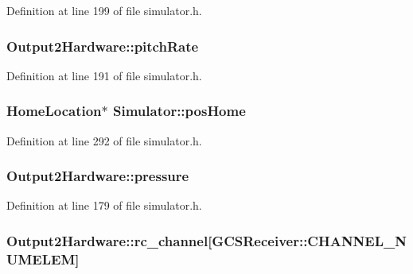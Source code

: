 Definition at line 199 of file simulator.\-h.

\hypertarget{group___h_i_t_l_plugin_ga9d3248d73390ba0b13ca165ee1f1fef0}{
\subsubsection[{pitch\-Rate}]{ Output2\-Hardware\-::pitch\-Rate}}\label{group___h_i_t_l_plugin_ga9d3248d73390ba0b13ca165ee1f1fef0}


Definition at line 191 of file simulator.\-h.

\hypertarget{group___h_i_t_l_plugin_ga9fcd56565e3cb4d64bc0c71c0a6151c1}{
\subsubsection[{pos\-Home}]{\setlength{\rightskip}{0pt plus 5cm}Home\-Location$\ast$ Simulator\-::pos\-Home\hspace{0.3cm}{\ttfamily [protected]}}}\label{group___h_i_t_l_plugin_ga9fcd56565e3cb4d64bc0c71c0a6151c1}


Definition at line 292 of file simulator.\-h.

\hypertarget{group___h_i_t_l_plugin_ga9c1fdbe8d01c5346b54b71beff806a7e}{
\subsubsection[{pressure}]{ Output2\-Hardware\-::pressure}}\label{group___h_i_t_l_plugin_ga9c1fdbe8d01c5346b54b71beff806a7e}


Definition at line 179 of file simulator.\-h.

\hypertarget{group___h_i_t_l_plugin_gadf58977eef899196280267ae39cc6f65}{
\subsubsection[{rc\-\_\-channel}]{ Output2\-Hardware\-::rc\-\_\-channel\mbox{[}G\-C\-S\-Receiver\-::\-C\-H\-A\-N\-N\-E\-L\-\_\-\-N\-U\-M\-E\-L\-E\-M\mbox{]}}}\label{group___h_i_t_l_plugin_gadf58977eef899196280267ae39cc6f65}


